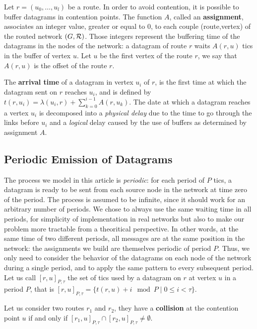 \documentclass[10pt, conference, letterpaper]{IEEEtran}
\begin{document}
          Let $r=(u_0,\dots,u_l)$ be a route. In order to avoid contention, it is possible to buffer datagrams in contention points. The function $A$, called an \textbf{assignment}, associates an integer value, greater or equal to $0$, to each couple (route,vertex) of the routed network $(G,{\cal R})$. Those integers represent the buffering time of the datagrams in the nodes of the network: a datagram of route $r$ waits $A(r,u)$ tics in the buffer of vertex $u$. 
          Let $u$ be the first vertex of the route $r$, we say that $A(r,u)$ is the offset of the 
          route $r$.         
       

 The \textbf{arrival time} of a datagram in vertex $u_i$ of $r$, is the first time at which the datagram sent on $r$ reaches $u_i$, and is defined by $t(r,u_i) = \lambda(u_i,r) + \sum_{k=0}^{i-1} A(r,u_k) $. The date at which a datagram reaches a vertex $u_i$ is decomposed into a \emph{physical delay} due to the time to go through the links before $u_i$ and a \emph{logical} delay caused by the use of buffers as determined by assignment $A$.

 
     
 \subsection{Periodic Emission of Datagrams}

 	The process we model in this article is \emph{periodic}: for each period of $P$ tics, a datagram is ready to be sent from each source node in the network at time zero of the period. The process is assumed to be infinite, since it should work for an arbitrary number of periods. We chose to always use the same waiting time in all periods, for simplicity of implementation in real networks but also to make our problem more tractable from a theoritical perspective. In other words, at the same time of two different periods, all messages are at the same position in the network: the assignments we build are themselves periodic of period $P$. Thus, we only need to consider the behavior of the datagrams on each node of the network during a single period, and to apply the same pattern to every subsequent period. 
    Let us call $[r,u]_{P,\tau}$ the set of tics used by a datagram on $r$ at vertex $u$ in a period $P$, that is $[r,u]_{P,\tau} = \{t(r,u) + i \mod P \mid 0 \leq i < \tau \}$. 

      Let us consider two routes $r_1$ and $r_2$, they have a {\bf collision} at the contention point $u$ if and only if $[r_1,u]_{P,\tau} \cap [r_2,u]_{P,\tau} \neq \emptyset$.\\
\end{document}
